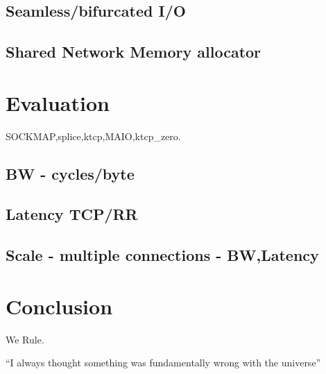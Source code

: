 \documentclass[newfonts=false,format=sigconf,9pt,letterpaper]{acmart}
\newcommand{\oursys}{MAIO\xspace}
\begin{document}
\subsection{Seamless/bifurcated I/O}
\subsection{Shared Network Memory allocator}
\section{Evaluation}
SOCKMAP,splice,ktcp,\oursys,ktcp\_zero.
\subsection{BW - cycles/byte}
\subsection{Latency TCP/RR}
\subsection{Scale - multiple connections - BW,Latency}
\section{Conclusion}
We Rule.

``I always thought something was fundamentally wrong with the universe'' \citep{adams1995hitchhiker}



\end{document}

